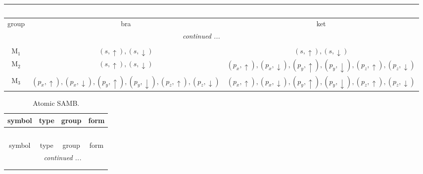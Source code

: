 \documentclass[fleqn,10pt,landscape]{article}
\begin{document}
\begin{itemize}
\begin{center}
\begin{longtable}{c|c|c}
\multicolumn{2}{l}{\tablename\ \thetable{}} \\
 \hline \hline
group & bra & ket \\ \hline \endhead

 \hline \hline
\multicolumn{2}{r}{\footnotesize\it continued ...} \\ \endfoot

 \hline \hline
\multicolumn{2}{r}{} \\ \endlastfoot

M$_{1}$ & $(s,\uparrow), (s,\downarrow)$ & $(s,\uparrow), (s,\downarrow)$ \\
M$_{2}$ & $(s,\uparrow), (s,\downarrow)$ & $(p_{x},\uparrow), (p_{x},\downarrow), (p_{y},\uparrow), (p_{y},\downarrow), (p_{z},\uparrow), (p_{z},\downarrow)$ \\
M$_{3}$ & $(p_{x},\uparrow), (p_{x},\downarrow), (p_{y},\uparrow), (p_{y},\downarrow), (p_{z},\uparrow), (p_{z},\downarrow)$ & $(p_{x},\uparrow), (p_{x},\downarrow), (p_{y},\uparrow), (p_{y},\downarrow), (p_{z},\uparrow), (p_{z},\downarrow)$ \\
\end{longtable}
\end{center}
\begin{center}
\renewcommand{\arraystretch}{1.3}
\begin{longtable}{c|c|c|c}
\caption{Atomic SAMB.}
 \\
 \hline \hline
symbol & type & group & form \\ \hline \endfirsthead

\multicolumn{3}{l}{\tablename\ \thetable{}} \\
 \hline \hline
symbol & type & group & form \\ \hline \endhead

 \hline \hline
\multicolumn{3}{r}{\footnotesize\it continued ...} \\ \endfoot

 \hline \hline
\multicolumn{3}{r}{} \\ \endlastfoot


\end{longtable}
\end{center}
\end{itemize}
\end{document}

